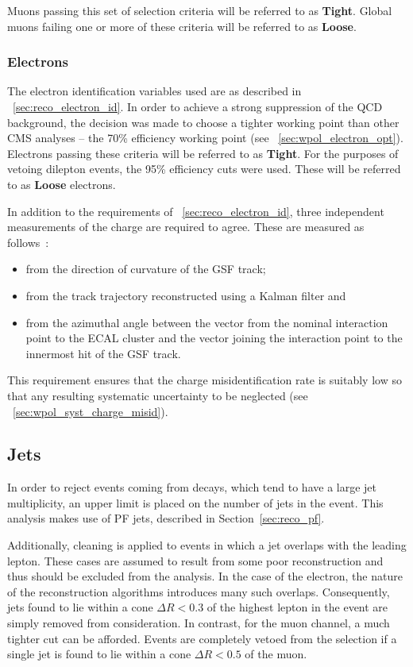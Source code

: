 Muons passing this set of selection criteria will be referred to as
\textbf{Tight}. Global muons failing one or more of these criteria will be
referred to as \textbf{Loose}.

\subsubsection{Electrons}
\label{sec:wpol_electronid}
The electron identification variables used are as described in
\sec~\ref{sec:reco_electron_id}. In order to achieve a strong suppression of the
\ac{QCD} background, the decision was made to choose a tighter working point
than other \ac{CMS} analyses -- the 70\% efficiency working point (see
\sec~\ref{sec:wpol_electron_opt}). Electrons passing these criteria will be
referred to as \textbf{Tight}. For the purposes of vetoing dilepton events, the
95\% efficiency cuts were used. These will be referred to as \textbf{Loose}
electrons.

In addition to the requirements of \sec~\ref{sec:reco_electron_id}, three independent
measurements of the charge are required to agree. These are measured as follows~\cite{wcharge_asymm2}:
\begin{itemize}
\item from the direction of curvature of the \ac{GSF} track;
\item from the track trajectory reconstructed using a Kalman filter and
\item from the azimuthal angle between the vector from the nominal interaction
  point to the \ac{ECAL} cluster and the vector joining the interaction point to
  the innermost hit of the \ac{GSF} track.
\end{itemize}
This requirement ensures that the charge misidentification rate is suitably low
so that any resulting systematic uncertainty to be neglected (see
\sec~\ref{sec:wpol_syst_charge_misid}).

\subsection{Jets}
\label{sec:wpol_jets}
In order to reject events coming from \ttbar decays, which tend to have a large
jet multiplicity, an upper limit is placed on the number of jets in the
event. This analysis makes use of \ac{PF} jets, described in
Section~\ref{sec:reco_pf}.

Additionally, cleaning is applied to events in which a jet overlaps with the
leading lepton. These cases are assumed to result from some poor reconstruction
and thus should be excluded from the analysis. In the case of the electron, the
nature of the reconstruction algorithms introduces many such
overlaps. Consequently, jets found to lie within a cone $\Delta R < 0.3$ of the
highest \Pt lepton in the event are simply removed from consideration. In
contrast, for the muon channel, a much tighter cut can be afforded. Events are
completely vetoed from the selection if a single jet is found to lie within a
cone $\Delta R < 0.5$ of the muon.

